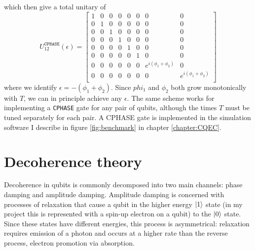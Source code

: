 \documentclass{report}
\begin{document}
\begin{appendices}
\begin{equation*}
\end{equation*}
which then give a total unitary of 
\begin{equation*}
     U^{\texttt{CPHASE}}_{12}(\epsilon) = 
     \begin{bmatrix}
        1 & 0 & 0 & 0 & 0 & 0 & 0 & 0\\
        0 & 1 & 0 & 0 & 0 & 0 & 0 & 0\\
        0 & 0 & 1 & 0 & 0 & 0 & 0 & 0\\
        0 & 0 & 0 & 1 & 0 & 0 & 0 & 0\\
        0 & 0 & 0 & 0 & 1 & 0 & 0 & 0\\
        0 & 0 & 0 & 0 & 0 & 1 & 0 & 0\\
        0 & 0 & 0 & 0 & 0 & 0 & e^{i(\phi_1 + \phi_2)} & 0\\
        0 & 0 & 0 & 0 & 0 & 0 & 0 & e^{i(\phi_1 + \phi_2)}\\
    \end{bmatrix}
\end{equation*} where we identify $\epsilon = -(\phi_1 + \phi_2)$. Since $phi_1$ and $\phi_2$ both grow monotonically with $T$, we can in principle achieve any $\epsilon$. The same scheme works for implementing a \texttt{CPHASE} gate for any pair of qubits, although the times $T$ must be tuned separately for each pair. A CPHASE gate is implemented in the simulation software I describe in figure \ref{fig:benchmark} in chapter \ref{chapter:CQEC}.

\chapter{Decoherence theory}\label{appendix:decoherence}
Decoherence in qubits is commonly decomposed into two main channels: phase damping and amplitude damping. Amplitude damping is concerned with processes of relaxation that cause a qubit in the higher energy $\ket{1}$ state (in my project this is represented with a spin-up electron on a qubit) to the $\ket{0}$ state. Since these states have different energies, this process is asymmetrical: relaxation requires emission of a photon and occurs at a higher rate than the reverse process\cite{Loss2022}, electron promotion via absorption. 


\end{appendices}
\end{document}
